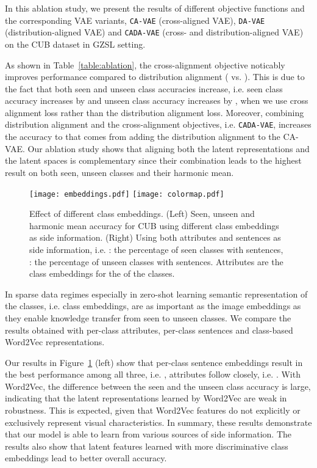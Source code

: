 \documentclass[10pt,twocolumn,letterpaper]{article}
\newcommand{\myparagraph}[1]{\vspace{6pt}\noindent{\bf #1}}
\begin{document}
\myparagraph{Analyzing Model Variants.}
In this ablation study, we present the results of different objective functions and the corresponding VAE variants, \texttt{CA-VAE} (cross-aligned VAE), \texttt{DA-VAE} (distribution-aligned VAE) and \texttt{CADA-VAE} (cross- and distribution-aligned VAE) on the CUB dataset in GZSL setting. 

As shown in Table~\ref{table:ablation}, the cross-alignment objective noticably improves performance compared to distribution alignment ( vs. ). This is due to the fact that both seen and unseen class accuracies increase, i.e. seen class accuracy increases by  and unseen class accuracy increases by , when we use cross alignment loss rather than the distribution alignment loss.
Moreover, combining distribution alignment and the cross-alignment objectives, i.e. \texttt{CADA-VAE}, increases the accuracy to  that comes from adding the distribution alignment to the CA-VAE. 
Our ablation study shows that aligning both the latent representations and the latent spaces is complementary since their combination leads to the highest result on both seen, unseen classes and their harmonic mean.

\begin{figure}[t]
\centering
\texttt{[image: embeddings.pdf]}
\hfill
\texttt{[image: colormap.pdf]}
\caption{Effect of different class embeddings. (Left) Seen, unseen and harmonic mean accuracy for CUB using different class embeddings as side information. (Right) Using both attributes and sentences as side information, i.e. : the percentage of seen classes with sentences, : the percentage of unseen classes with sentences. Attributes are the class embeddings for the  of the classes.
}
\label{fig:other_embeddings}
\end{figure}


\myparagraph{Analyzing Side Information.} 
In sparse data regimes especially in zero-shot learning semantic representation of the classes, i.e. class embeddings, are as important as the image embeddings as they enable knowledge transfer from seen to unseen classes. We compare the results obtained with per-class attributes, per-class sentences and class-based Word2Vec representations.

Our results in Figure~\ref{fig:other_embeddings} (left) show that per-class sentence embeddings result in the best performance among all three, i.e. , attributes follow closely, i.e. .
With Word2Vec, the difference between the seen and the unseen class accuracy is large, indicating that the latent representations learned by Word2Vec are weak in robustness. This is expected, given that Word2Vec features do not explicitly or exclusively represent visual characteristics. In summary, these results demonstrate that our model is able to learn from various sources of side information. The results also show that latent features learned with more discriminative class embeddings lead to better overall accuracy.
\end{document}
